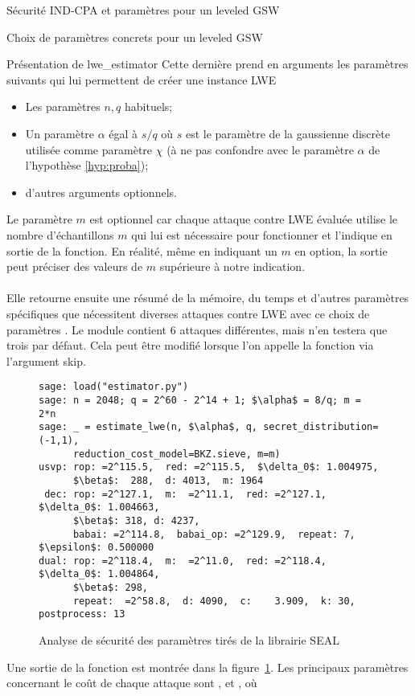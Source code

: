 \begin{section}{Sécurité IND-CPA et paramètres pour un leveled GSW}
\begin{subsection}{Choix de paramètres concrets pour un leveled GSW}
\begin{subsubsection}{Présentation de lwe\_estimator}
\flushleft
Cette dernière prend en arguments les paramètres suivants qui lui permettent de créer une instance LWE
\begin{itemize}
\item Les paramètres $n, q$ habituels;
\item Un paramètre $\alpha$ égal à $s / q$ où $s$ est le paramètre de la gaussienne discrète utilisée comme paramètre
$\chi$ (à ne pas confondre avec le paramètre $\alpha$ de l'hypothèse \ref{hyp:proba});
\item d'autres arguments optionnels.
\end{itemize}
Le paramètre $m$ est optionnel car chaque attaque contre LWE évaluée utilise le nombre d'échantillons $m$ qui lui est nécessaire 
pour fonctionner et l'indique en sortie de la fonction. En réalité, même en indiquant un $m$ en option, la
sortie peut préciser des valeurs de $m$ supérieure à notre indication.

\paragraph{}
Elle retourne ensuite une résumé de la mémoire, du temps et d'autres paramètres spécifiques que nécessitent
diverses attaques contre LWE avec ce choix de paramètres . Le module contient 6 attaques différentes, mais n'en testera que
trois par défaut. Cela peut être modifié lorsque l'on appelle la fonction  via l'argument skip.
\flushleft
\begin{figure}
\begin{lstlisting}[mathescape=true]
sage: load("estimator.py")
sage: n = 2048; q = 2^60 - 2^14 + 1; $\alpha$ = 8/q; m = 2*n
sage: _ = estimate_lwe(n, $\alpha$, q, secret_distribution=(-1,1), 
	  reduction_cost_model=BKZ.sieve, m=m)
usvp: rop: =2^115.5,  red: =2^115.5,  $\delta_0$: 1.004975,  
      $\beta$:  288,  d: 4013,  m: 1964
 dec: rop: =2^127.1,  m:  =2^11.1,  red: =2^127.1,  $\delta_0$: 1.004663,  
      $\beta$: 318, d: 4237,  
      babai: =2^114.8,  babai_op: =2^129.9,  repeat: 7,  $\epsilon$: 0.500000
dual: rop: =2^118.4,  m:  =2^11.0,  red: =2^118.4,  $\delta_0$: 1.004864,  
      $\beta$: 298,  
      repeat:  =2^58.8,  d: 4090,  c:    3.909,  k: 30, postprocess: 13
\end{lstlisting}
\caption{Analyse de sécurité des paramètres tirés de la librairie SEAL}
\label{fig:seal_estimate}
\end{figure}


\vspace{0.2cm}
Une sortie de la fonction  est montrée dans la figure~\ref{fig:seal_estimate}.
Les principaux paramètres concernant le coût de chaque attaque sont ,  et , où


\end{subsubsection}
\end{subsection}
\end{section}
